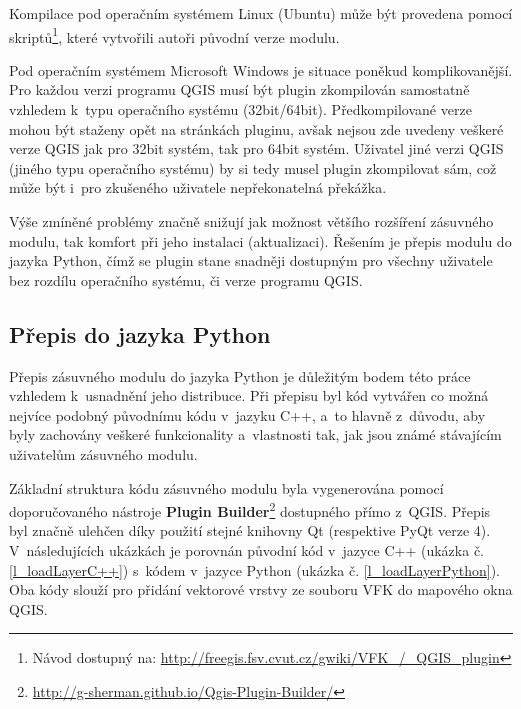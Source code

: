 \documentclass[a4paper,12pt,oneside]{book}
\begin{document}
Kompilace pod operačním systémem Linux (Ubuntu) může být provedena
pomocí skriptů\footnote{Návod dostupný na:
  \url{http://freegis.fsv.cvut.cz/gwiki/VFK\_/\_QGIS\_plugin}}, které
vytvořili autoři původní verze modulu.

Pod operačním systémem Microsoft Windows je situace poněkud
komplikovanější. Pro každou verzi programu QGIS musí být plugin
zkompilován samostatně vzhledem k~typu operačního systému
(32bit/64bit). Předkompilované verze mohou být staženy opět na
stránkách pluginu, avšak nejsou zde uvedeny veškeré verze QGIS jak pro
32bit systém, tak pro 64bit systém. Uživatel jiné verzi QGIS (jiného
typu operačního systému) by si tedy musel plugin zkompilovat sám, což
může být i~pro zkušeného uživatele nepřekonatelná překážka.

Výše zmíněné problémy značně snižují jak možnost většího rozšíření
zásuvného modulu, tak komfort při jeho instalaci
(aktualizaci). Řešením je přepis modulu do jazyka Python, čímž se
plugin stane snadněji dostupným pro všechny uživatele bez rozdílu
operačního systému, či verze programu QGIS.

\subsection{Přepis do jazyka Python}

Přepis zásuvného modulu do jazyka Python je důležitým bodem této
práce vzhledem k~usnadnění jeho distribuce. Při přepisu byl kód vytvářen 
co možná nejvíce podobný původnímu kódu v~jazyku C++, a~to hlavně z~důvodu, 
aby byly zachovány veškeré funkcionality a~vlastnosti tak, jak jsou známé
stávajícím uživatelům zásuvného modulu.

Základní struktura kódu zásuvného modulu byla vygenerována pomocí
doporučovaného nástroje \textbf{Plugin
Builder}\footnote{\url{http://g-sherman.github.io/Qgis-Plugin-Builder/}}
dostupného přímo z~QGIS. Přepis byl značně ulehčen díky použití stejné
knihovny Qt (respektive PyQt verze 4). V~následujících ukázkách je
porovnán původní kód v~jazyce C++ (ukázka č. \ref{l_loadLayerC++})
s~kódem v~jazyce Python (ukázka
č. \ref{l_loadLayerPython}). Oba kódy slouží pro přidání vektorové
vrstvy ze souboru VFK do mapového okna QGIS.
\end{document}
